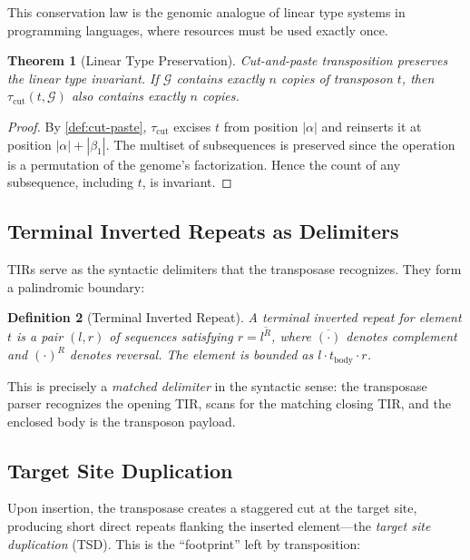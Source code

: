 \documentclass[12pt,a4paper]{article}
\newtheorem{theorem}{Theorem}[section]
\newtheorem{definition}[theorem]{Definition}
\newcommand{\Genome}{\mathcal{G}}
\begin{document}
This conservation law is the genomic analogue of linear type systems in programming
languages, where resources must be used exactly once.

\begin{theorem}[Linear Type Preservation]\label{thm:linear}
Cut-and-paste transposition preserves the linear type invariant. If $\Genome$ contains
exactly $n$ copies of transposon $t$, then $\tau_{\mathrm{cut}}(t, \Genome)$ also
contains exactly $n$ copies.
\end{theorem}

\begin{proof}
By \cref{def:cut-paste}, $\tau_{\mathrm{cut}}$ excises $t$ from position $|\alpha|$
and reinserts it at position $|\alpha| + |\beta_1|$. The multiset of subsequences is
preserved since the operation is a permutation of the genome's factorization. Hence the
count of any subsequence, including $t$, is invariant.
\end{proof}

\subsection{Terminal Inverted Repeats as Delimiters}

TIRs serve as the syntactic delimiters that the transposase recognizes. They form a
palindromic boundary:

\begin{definition}[Terminal Inverted Repeat]\label{def:tir}
A \emph{terminal inverted repeat} for element $t$ is a pair $(l, r)$ of sequences
satisfying $r = \overline{l^R}$, where $\overline{(\cdot)}$ denotes complement and
$(\cdot)^R$ denotes reversal. The element is bounded as $l \cdot t_{\mathrm{body}} \cdot r$.
\end{definition}

This is precisely a \emph{matched delimiter} in the syntactic sense: the transposase
parser recognizes the opening TIR, scans for the matching closing TIR, and the enclosed
body is the transposon payload.

\subsection{Target Site Duplication}

Upon insertion, the transposase creates a staggered cut at the target site, producing
short direct repeats flanking the inserted element---the \emph{target site duplication}
(TSD). This is the ``footprint'' left by transposition:
\end{document}
